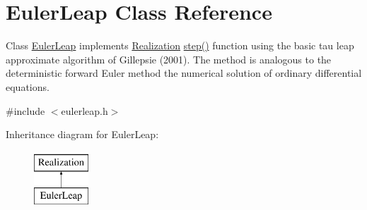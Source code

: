 \hypertarget{class_euler_leap}{}\section{Euler\+Leap Class Reference}
\label{class_euler_leap}


Class \hyperlink{class_euler_leap}{Euler\+Leap} implements \hyperlink{class_realization}{Realization} \hyperlink{class_euler_leap_a25b1ea90a95bfd41ecb919605683da9d}{step()} function using the basic tau leap approximate algorithm of Gillepsie (2001). The method is analogous to the deterministic forward Euler method the numerical solution of ordinary differential equations.  




{\ttfamily \#include $<$eulerleap.\+h$>$}

Inheritance diagram for Euler\+Leap\+:\begin{figure}[H]
\begin{center}
\leavevmode
\includegraphics[height=2.000000cm]{class_euler_leap}
\end{center}
\end{figure}
